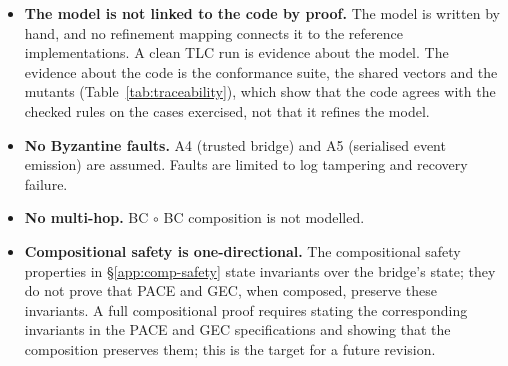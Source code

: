 \begin{itemize}[leftmargin=2em]
record whose verification is the possession predicate of
Appendix~\ref{app:attacker}, so TLC checks the protocol against an attacker
that holds no client key, not the scheme: unforgeability is assumed, not
model-checked. The cryptographic checks are exercised by the conformance
suite and its mutants (Ed25519 and ECDSA P-256 signatures, a registry of
public keys and scheme tags only).
\item \textbf{The model is not linked to the code by proof.} The model
is written by hand, and no refinement mapping connects it to the reference
implementations. A clean TLC run is evidence about the model. The evidence
about the code is the conformance suite, the shared vectors and the
mutants (Table~\ref{tab:traceability}), which show that the code agrees with
the checked rules on the cases exercised, not that it refines the model.
\item \textbf{No Byzantine faults.} A4 (trusted bridge) and A5
(serialised event emission) are assumed. Faults are limited to log
tampering and recovery failure.
\item \textbf{No multi-hop.} BC $\circ$ BC composition is not modelled.
\item \textbf{Compositional safety is one-directional.} The
compositional safety properties in \S\ref{app:comp-safety} state
invariants over the bridge's state; they do not prove that PACE and
GEC, when composed, preserve these invariants. A full compositional
proof requires stating the corresponding invariants in the PACE and
GEC specifications and showing that the composition preserves them;
this is the target for a future revision.
\end{itemize}

